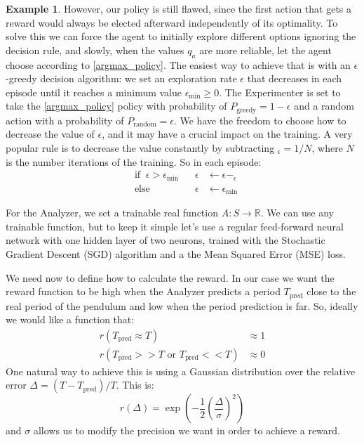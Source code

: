 \documentclass[11pt,a4paper,twoside]{report}
\newcommand{\+}{\textnormal{+} }
\theoremstyle{definition}
\newtheorem{myex}[mythm]{Example}
\numberwithin{equation}{chapter}
\begin{document}
\begin{myex}
However, our policy is still flawed, since the first action that gets a reward
would always be elected afterward independently of its optimality. To solve this
we can force the agent to initially explore different options ignoring the
decision rule, and slowly, when the values $q_a$ are more reliable, let the
agent choose according to \eqref{argmax_policy}. The easiest way to achieve that
is with an $\epsilon$-greedy decision algorithm: we set an exploration rate
$\epsilon$ that decreases in each episode until it reaches a minimum value
$\epsilon_\text{min}\geq 0$. The Experimenter is set to take the
\eqref{argmax_policy} policy with probability of $P_{\text{greedy}}=1-\epsilon$
and a random action with a probability of $P_{\text{random}}=\epsilon$. We have
the freedom to choose how to decrease the value of $\epsilon$, and it may have a
crucial impact on the training. A very popular rule is to decrease the value
constantly by subtracting $_\epsilon = 1/N$, where $N$ is the number
iterations of the training. So in each episode:
\begin{align}
  &\text{if}\; \; \epsilon > \epsilon_\text{min} \;\;\; &\epsilon&\leftarrow\epsilon - _\epsilon \\
  &\text{else} \; \;  &\epsilon &\leftarrow \epsilon_\text{min}
\end{align} 


For the Analyzer, we set a trainable real function $A: S \rightarrow
\mathbb{R}$. We can use any trainable function, but to keep it simple let's use
a regular feed-forward neural network with one hidden layer of two neurons,
trained with the Stochastic Gradient Descent (SGD) algorithm and a the Mean
Squared Error (MSE) loss.

We need now to define how to calculate the reward.  In our case we want the
reward function to be high when the Analyzer predicts a period $T_\text{pred}$
close to the real period of the pendulum and low when the period prediction is
far. So, ideally we would like a function that:
\begin{align}
       r(T_{\text{pred}} \approx T) &\approx 1\\
       r(T_{\text{pred}}>> T \text{ or } T_{\text{pred}} << T) & \approx 0
\end{align}
One natural way to achieve this is using a Gaussian distribution over the
relative error $\Delta=(T-T_{\text{pred}})/T$. This is:
\begin{equation}
   r(\Delta)=\exp\left(-\frac{1}{2}\left( \frac{\Delta}{\sigma} \right) ^2\right)
  \label{gaussian_reward}
\end{equation}
and $\sigma$ allows us to modify the precision we want in order to achieve a 
reward.


\end{myex}
\end{document}
